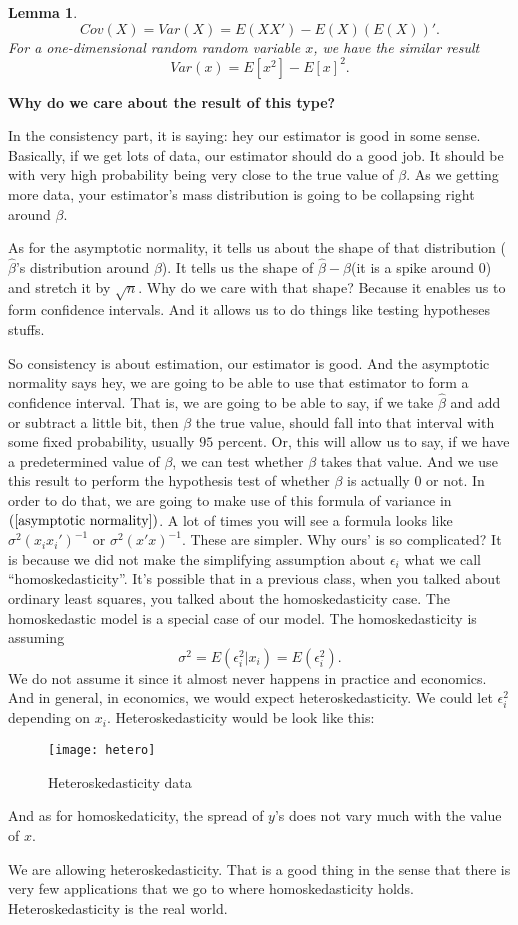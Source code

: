 \documentclass[11pt,a4paper]{amsart}
\theoremstyle{plain}
\newtheorem{lemma}{Lemma}
\theoremstyle{definition}
\begin{document}
  		\begin{lemma}\label{lemma cov}
  			\[	Cov(X) = Var(X) = E(XX') - E(X)(E(X))'.	\]
  			For a one-dimensional random random variable $x$, we have the similar result
  			\[	Var(x) = E[x^{2}] - E[x]^{2}.	\]
   		\end{lemma}
  		\textbf{Why do we care about the result of this type?}\par 
  		In the consistency part, it is saying: hey our estimator is good in some sense. Basically, if we get lots of data, our estimator should do a good job. It should be with very high probability being very close to the true value of $\beta$. As we getting more data, your estimator's mass distribution is going to be collapsing right around $\beta$. \par 
  		As for the asymptotic normality, it tells us about the shape of that distribution ($\hat{\beta}$'s distribution around $\beta$). It tells us the shape of $\hat{\beta} - \beta$(it is a spike around $0$) and stretch it by $\sqrt{n}$. Why do we care with that shape? Because it enables us to form confidence intervals. And it allows us to do things like testing hypotheses stuffs.\par
  		So consistency is about estimation, our estimator is good. And the asymptotic normality says hey, we are going to be able to use that estimator to form a confidence interval. That is, we are going to be able to say, if we take $\hat{\beta}$ and add or subtract a little bit, then $\beta$ the true value, should fall into that interval with some fixed probability, usually $95$ percent. Or, this will allow us to say, if we have a predetermined value of $\beta$, we can test whether $\beta$ takes that value.  And we use this result to perform the hypothesis test of whether $\beta$ is actually $0$ or not. In order to do that, we are going to make use of this formula of variance in $(\ref{asymptotic normality})$. A lot of times you will see a formula looks like $\sigma^{2}(x_{i}x_{i}')^{-1}$ or $\sigma^{2}(x'x)^{-1}$. These are simpler. Why ours' is so complicated? It is because we did not make the simplifying assumption about $\epsilon_{i}$ what we call ``homoskedasticity''. It's possible that in a previous class, when you talked about ordinary least squares, you talked about the homoskedasticity case. The homoskedastic model is a special case of our model. The homoskedasticity is assuming 
  		\[	\sigma^{2} = E(\epsilon_{i}^{2}|x_{i}) = E(\epsilon_{i}^{2}).	\]
  		We do not assume it since it almost never happens in practice and economics. And in general, in economics, we would expect heteroskedasticity. We could let $\epsilon_{i}^{2}$ depending on $x_{i}$. Heteroskedasticity would be look like this:
  		\begin{figure}[hbt]
  			{\centering \texttt{[image: hetero]}}
  			\caption{Heteroskedasticity data}
  		\end{figure}
  		And as for homoskedaticity, the spread of $y$'s does not vary much with the value of $x$.\par 
  		We are allowing heteroskedasticity. That is a good thing in the sense that there is very few applications that we go to where homoskedasticity holds. Heteroskedasticity is the real world. 
\end{document}
